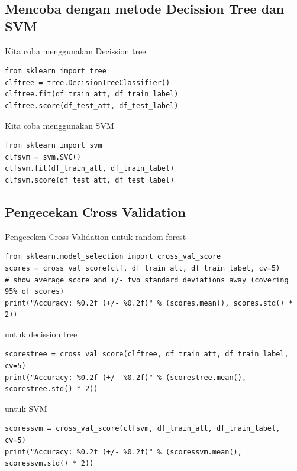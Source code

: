 \subsection{Mencoba dengan metode Decission Tree dan SVM}
Kita coba menggunakan Decission tree 
\begin{lstlisting}[caption=Mencoba klasifikasi dengan decission tree dengan dataset yang sama,label={lst:3.19}]
from sklearn import tree
clftree = tree.DecisionTreeClassifier()
clftree.fit(df_train_att, df_train_label)
clftree.score(df_test_att, df_test_label)
\end{lstlisting}
Kita coba menggunakan SVM
\begin{lstlisting}[caption=Mencoba klasifikasi dengan SVM dengan dataset yang sama,label={lst:3.20}]
from sklearn import svm
clfsvm = svm.SVC()
clfsvm.fit(df_train_att, df_train_label)
clfsvm.score(df_test_att, df_test_label)
\end{lstlisting}

\subsection{Pengecekan Cross Validation}
Pengeceken Cross Validation untuk random forest
\begin{lstlisting}[caption=Hasil Cross Validation random forest,label={lst:3.21}]
from sklearn.model_selection import cross_val_score
scores = cross_val_score(clf, df_train_att, df_train_label, cv=5)
# show average score and +/- two standard deviations away (covering 95% of scores)
print("Accuracy: %0.2f (+/- %0.2f)" % (scores.mean(), scores.std() * 2))
\end{lstlisting}
untuk decission tree
\begin{lstlisting}[caption=Hasil Cross Validation Decission Tree,label={lst:3.22}]
scorestree = cross_val_score(clftree, df_train_att, df_train_label, cv=5)
print("Accuracy: %0.2f (+/- %0.2f)" % (scorestree.mean(), scorestree.std() * 2))
\end{lstlisting}
untuk SVM
\begin{lstlisting}[caption=Hasil Cross Validation SVM,label={lst:3.23}]
scoressvm = cross_val_score(clfsvm, df_train_att, df_train_label, cv=5)
print("Accuracy: %0.2f (+/- %0.2f)" % (scoressvm.mean(), scoressvm.std() * 2))
\end{lstlisting}



